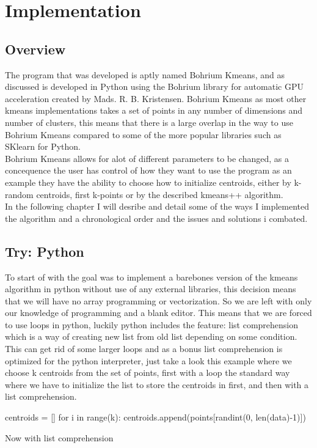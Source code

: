 \documentclass[12pt]{report}
\begin{document}
\chapter{Implementation}
\label{subsec:implement}
\section{Overview}
\label{subsec:overview}
The program that was developed is aptly named Bohrium Kmeans, and as discussed is developed in Python using the Bohrium library for automatic GPU acceleration created by Mads. R. B. Kristensen. Bohrium Kmeans as most other kmeans implementations takes a set of points in any number of dimensions and number of clusters, this means that there is a large overlap in the way to use Bohrium Kmeans compared to some of the more popular libraries such as SKlearn for Python.\\
Bohrium Kmeans allows for alot of different parameters to be changed, as a concequence the user has control of how they want to use the program as an example they have the ability to choose how to initialize centroids, either by k-random centroids, first k-points or by the described kmeans++ algorithm.\\
In the following chapter I will desribe and detail some of the ways I implemented the algorithm and a chronological order and the issues and solutions i combated.
\section{Try: Python}
\label{subsec:beginning}
To start of with the goal was to implement a barebones version of the kmeans algorithm in python without use of any external libraries, this decision means that we will have no array programming or vectorization. So we are left with only our knowledge of programming and a blank editor.
This means that we are forced to use loops in python, luckily python includes the feature: list comprehension which is a way of creating new list from  old list depending on some condition. This can get rid of some larger loops and as a bonus list comprehension is optimized for the python interpreter, just take a look this example where we choose k centroids from the set of points, first with a loop the standard way where we have to initialize the list to store the centroids in first, and then with a list comprehension.

\begin{python}[caption={Generating k random centroids using for loop in python}]
  centroids = []
  for i in range(k):
      centroids.append(points[randint(0, len(data)-1)])
\end{python}
Now with list comprehension
\end{document}
